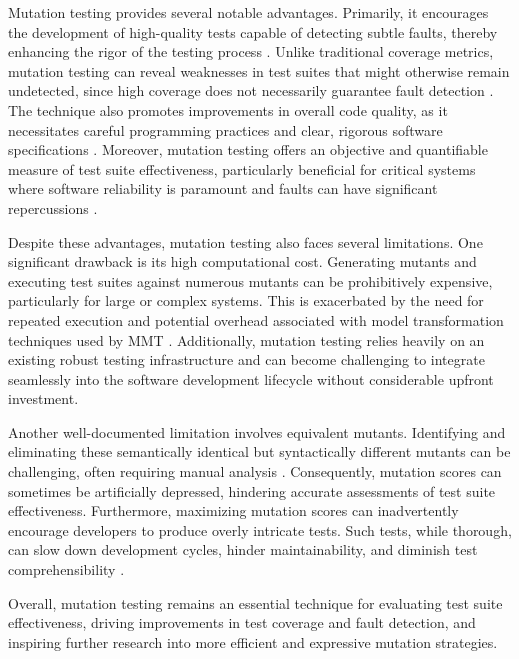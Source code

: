 \documentclass[sigplan, nonacm]{acmart}
\begin{document}
Mutation testing provides several notable advantages. Primarily, it
encourages the development of high-quality tests capable of detecting subtle
faults, thereby enhancing the rigor of the testing process
\cite{jia_analysis_2011}. Unlike traditional coverage metrics, mutation
testing can reveal weaknesses in test suites that might otherwise remain
undetected, since high coverage does not necessarily guarantee fault
detection \cite{jia_analysis_2011, bockisch_mmt_2024}. The technique also
promotes improvements in overall code quality, as it necessitates careful
programming practices and clear, rigorous software specifications
\cite{offutt_mutation_2001}. Moreover, mutation testing offers an objective
and quantifiable measure of test suite effectiveness, particularly beneficial
for critical systems where software reliability is paramount and faults can
have significant repercussions \cite{offutt_mutation_2001,jia_analysis_2011}.

Despite these advantages, mutation testing also faces several limitations.
One significant drawback is its high computational cost. Generating mutants
and executing test suites against numerous mutants can be prohibitively
expensive, particularly for large or complex systems. This is exacerbated by
the need for repeated execution and potential overhead associated with model
transformation techniques used by MMT \cite{bockisch_mutation_2024}.
Additionally, mutation testing relies heavily on an existing robust testing
infrastructure and can become challenging to integrate seamlessly into the
software development lifecycle without considerable upfront investment.

Another well-documented limitation involves equivalent mutants. Identifying
and eliminating these semantically identical but syntactically different
mutants can be challenging, often requiring manual analysis
\cite{jia_analysis_2011}. Consequently, mutation scores can sometimes be
artificially depressed, hindering accurate assessments of test suite
effectiveness. Furthermore, maximizing mutation scores can inadvertently
encourage developers to produce overly intricate tests. Such tests, while
thorough, can slow down development cycles, hinder maintainability, and
diminish test comprehensibility \cite{offutt_mutation_2001,jia_analysis_2011}.

Overall, mutation testing remains an essential technique for evaluating test
suite effectiveness, driving improvements in test coverage and fault
detection, and inspiring further research into more efficient and expressive
mutation strategies.
\end{document}
